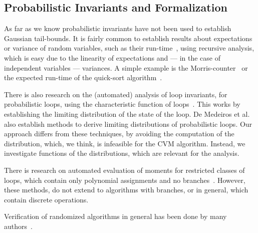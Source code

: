 \subsection{Probabilistic Invariants and Formalization}
As far as we know probabilistic invariants have not been used to establish Gaussian tail-bounds.
It is fairly common to establish results about expectations or variance of random variables, such as their run-time~\cite[Section 1.4]{motwani1995}, using recursive analysis, which is easy due to the linearity of expectations and --- in the case of independent variables --- variances.
A simple example is the Morris-counter~\cite{morris1978} or the expected run-time of the quick-sort algorithm~\cite[Section 2.5]{mitzenmacher2005}.

There is also research on the (automated) analysis of loop invariants, for probabilistic loops, using the characteristic function of loops~\cite{batz2023, mciver2005}.
This works by establishing the limiting distribution of the state of the loop.
De Medeiros et al.~\cite[Section 3.2]{demedeiros2024} also establish methods to derive limiting distributions of probabilistic loops.
Our approach differs from these techniques, by avoiding the computation of the distribution, which, we think, is infeasible for the CVM algorithm.
Instead, we investigate functions of the distributions, which are relevant for the analysis.

There is research on automated evaluation of moments for restricted classes of loops, which contain only polynomial assignments and no branches~\cite{bartocci2019,kofnov2022}.
However, these methods, do not extend to algorithms with branches, or in general, which contain discrete operations.

Verification of randomized algorithms in general has been done by many authors~\cite{bosshard2024, eberl2020, karayel2022, karayel2023, Probabilistic_Prime_Tests-AFP, tan2024}.
